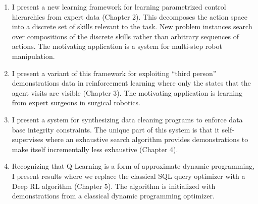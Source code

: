 \begin{enumerate}
    \item I present a new learning framework for learning parametrized control hierarchies from expert data (Chapter 2). This decomposes the action space into a discrete set of skills relevant to the task. New problem instances search over compositions of the discrete skills rather than arbitrary sequences of actions. The motivating application is a system for multi-step robot manipulation.
    
    \item I present a variant of this framework for exploiting ``third person'' demonstrations data in reinforcement learning where only the states that the agent visits are visible (Chapter 3). The motivating application is learning from expert surgeons in surgical robotics.
    
    \item I present a system for synthesizing data cleaning programs to enforce data base integrity constraints. The unique part of this system is that it self-supervises where an exhaustive search algorithm provides demonstrations to make itself incrementally less exhaustive (Chapter 4). 
    
    \item Recognizing that Q-Learning is a form of approximate dynamic programming, I present results where we replace the classical SQL query optimizer with a Deep RL algorithm (Chapter 5). The algorithm is initialized with demonstrations from a classical dynamic programming optimizer.
    
\end{enumerate}







